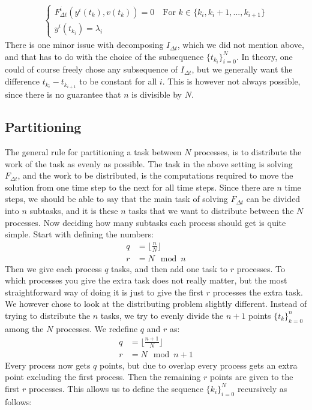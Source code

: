 \begin{align*}
\left\{
     \begin{array}{lr}
		F_{\Delta t}^i(y^i(t_k),v(t_k))=0 \quad	\textrm{For $k \in \{k_i,k_i+1,...,k_{i+1} \}$} \\
		y^i(t_{k_i})=\lambda_i
	\end{array}
   \right.	
\end{align*} 
There is one minor issue with decomposing $I_{\Delta t}$, which we did not mention above, and that has to do with the choice of the subsequence $\{t_{k_i}\}_{i=0}^N$. In theory, one could of course freely chose any subsequence of $I_{\Delta t}$, but we generally want the difference $t_{k_i} -t_{k_{i+1}}$ to be constant for all $i$. This is however not always possible, since there is no guarantee that $n$ is divisible by $N$.
\subsection{Partitioning}
The general rule for partitioning a task between $N$ processes, is to distribute the work of the task as evenly as possible. The task in the above setting is solving $ F_{\Delta t}$, and the work to be distributed, is the computations required to move the solution from one time step to the next for all time steps. Since there are $n$ time steps, we should be able to say that the main task of solving $F_{\Delta t}$ can be divided into $n$ subtasks, and it is these $n$ tasks that we want to distribute between the $N$ processes. Now deciding how many subtasks each process should get is quite simple. Start with defining the numbers:
\begin{align*}
q &= \lfloor \frac{n}{N}\rfloor \\
r &= N \mod n
\end{align*} 
Then we give each process $q$ tasks, and then add one task to $r$ processes. To which processes you give the extra task does not really matter, but the most straightforward way of doing it is just to give the first $r$ processes the extra task. We however chose to look at the distributing problem slightly different. Instead of trying to distribute the $n$ tasks, we try to evenly divide the $n+1$ points $\{t_k\}_{k=0}^{n}$ among the $N$ processes. We redefine $q$ and $r$ as:
\begin{align*}
q &= \lfloor \frac{n+1}{N}\rfloor \\
r &= N \mod n+1
\end{align*}
Every process now gets $q$ points, but due to overlap every process gets an extra point excluding the first process. Then the remaining $r$ points are given to the first $r$ processes. This allows us to define the sequence $\{k_{i}\}_{i=0}^N$ recursively as follows:
